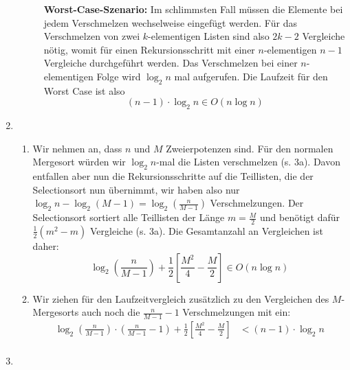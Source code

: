 \documentclass[a4paper,10pt]{scrartcl}
\begin{document}
\begin{enumerate}
\begin{description}
\textbf{Worst-Case-Szenario:}  Im schlimmsten Fall müssen die Elemente bei jedem Verschmelzen wechselweise eingefügt werden.
Für das Verschmelzen von zwei $k$-elementigen Listen sind also $2k-2$ Vergleiche nötig, womit für einen Rekursionsschritt mit einer $n$-elementigen $n - 1$ Vergleiche durchgeführt werden.
Das Verschmelzen bei einer $n$-elementigen Folge wird $\log_2 n$ mal aufgerufen.
Die Laufzeit für den Worst Case ist also
\[
 (n-1) \cdot \log_2 n \in O(n \log n)
\]
      \end{description}
\item \begin{enumerate}
       \item Wir nehmen an, dass $n$ und $M$ Zweierpotenzen sind. Für den normalen Mergesort würden wir $\log_2 n$-mal die Listen verschmelzen (s. 3a). Davon entfallen aber nun die Rekursionsschritte auf die Teillisten, die der Selectionsort nun übernimmt, wir haben also nur $\log_2 n - \log_2 (M-1) = \log_2\left(\frac{n}{M-1}\right)$ Verschmelzungen. Der Selectionsort sortiert alle Teillisten der Länge $m = \frac{M}{2}$ und benötigt dafür $\frac{1}{2}(m^2-m)$ Vergleiche (s. 3a). Die Gesamtanzahl an Vergleichen ist daher:
             \[\log_2\left(\frac{n}{M-1}\right) + \frac{1}{2}\left[\frac{M^2}{4}-\frac{M}{2}\right] \in O(n \log n)\]
       \item Wir ziehen für den Laufzeitvergleich zusätzlich zu den Vergleichen des $M$-Mergesorts auch noch die $\frac{n}{M-1}-1$ Verschmelzungen mit ein:
             \[
             \]
             \begin{align*}
              \log_2\left(\frac{n}{M-1}\right) \cdot \left(\frac{n}{M-1}-1\right) + \frac{1}{2}\left[\frac{M^2}{4}-\frac{M}{2}\right] &< (n-1) \cdot \log_2 n \\
             \end{align*}
      \end{enumerate}
\item 
\end{enumerate}
\end{document}
